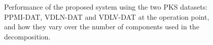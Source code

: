 \begin{figure}
	
	\caption{Performance of the proposed system using the two \ac{PKS} datasets: PPMI-DAT, VDLN-DAT and VDLV-DAT at the operation point, and how they vary over the number of components used in the decomposition. } 
	\label{fig:accuracyOP-PKS}
\end{figure}



